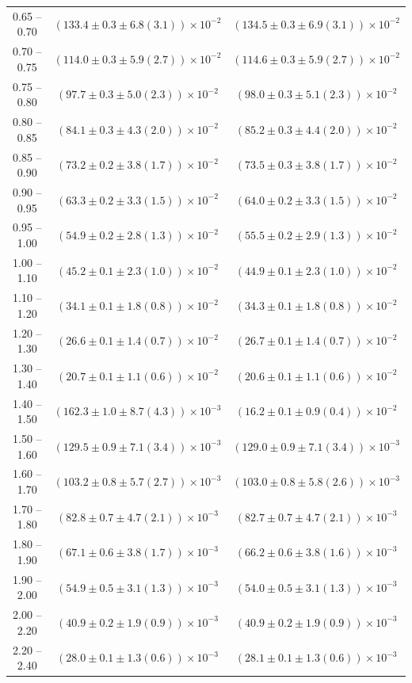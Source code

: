 \begin{table}
\begin{center}
\begin{tabular}{ c | c c }
0.65 -- 0.70 & $(133.4\pm0.3\pm6.8(3.1))\times10^{-2}$ & $(134.5\pm0.3\pm6.9(3.1))\times10^{-2}$ \\ 
0.70 -- 0.75 & $(114.0\pm0.3\pm5.9(2.7))\times10^{-2}$ & $(114.6\pm0.3\pm5.9(2.7))\times10^{-2}$ \\ 
0.75 -- 0.80 & $(97.7\pm0.3\pm5.0(2.3))\times10^{-2}$ & $(98.0\pm0.3\pm5.1(2.3))\times10^{-2}$ \\ 
0.80 -- 0.85 & $(84.1\pm0.3\pm4.3(2.0))\times10^{-2}$ & $(85.2\pm0.3\pm4.4(2.0))\times10^{-2}$ \\ 
0.85 -- 0.90 & $(73.2\pm0.2\pm3.8(1.7))\times10^{-2}$ & $(73.5\pm0.3\pm3.8(1.7))\times10^{-2}$ \\ 
0.90 -- 0.95 & $(63.3\pm0.2\pm3.3(1.5))\times10^{-2}$ & $(64.0\pm0.2\pm3.3(1.5))\times10^{-2}$ \\ 
0.95 -- 1.00 & $(54.9\pm0.2\pm2.8(1.3))\times10^{-2}$ & $(55.5\pm0.2\pm2.9(1.3))\times10^{-2}$ \\ 
1.00 -- 1.10 & $(45.2\pm0.1\pm2.3(1.0))\times10^{-2}$ & $(44.9\pm0.1\pm2.3(1.0))\times10^{-2}$ \\ 
1.10 -- 1.20 & $(34.1\pm0.1\pm1.8(0.8))\times10^{-2}$ & $(34.3\pm0.1\pm1.8(0.8))\times10^{-2}$ \\ 
1.20 -- 1.30 & $(26.6\pm0.1\pm1.4(0.7))\times10^{-2}$ & $(26.7\pm0.1\pm1.4(0.7))\times10^{-2}$ \\ 
1.30 -- 1.40 & $(20.7\pm0.1\pm1.1(0.6))\times10^{-2}$ & $(20.6\pm0.1\pm1.1(0.6))\times10^{-2}$ \\ 
1.40 -- 1.50 & $(162.3\pm1.0\pm8.7(4.3))\times10^{-3}$ & $(16.2\pm0.1\pm0.9(0.4))\times10^{-2}$ \\ 
1.50 -- 1.60 & $(129.5\pm0.9\pm7.1(3.4))\times10^{-3}$ & $(129.0\pm0.9\pm7.1(3.4))\times10^{-3}$ \\ 
1.60 -- 1.70 & $(103.2\pm0.8\pm5.7(2.7))\times10^{-3}$ & $(103.0\pm0.8\pm5.8(2.6))\times10^{-3}$ \\ 
1.70 -- 1.80 & $(82.8\pm0.7\pm4.7(2.1))\times10^{-3}$ & $(82.7\pm0.7\pm4.7(2.1))\times10^{-3}$ \\ 
1.80 -- 1.90 & $(67.1\pm0.6\pm3.8(1.7))\times10^{-3}$ & $(66.2\pm0.6\pm3.8(1.6))\times10^{-3}$ \\ 
1.90 -- 2.00 & $(54.9\pm0.5\pm3.1(1.3))\times10^{-3}$ & $(54.0\pm0.5\pm3.1(1.3))\times10^{-3}$ \\ 
2.00 -- 2.20 & $(40.9\pm0.2\pm1.9(0.9))\times10^{-3}$ & $(40.9\pm0.2\pm1.9(0.9))\times10^{-3}$ \\ 
2.20 -- 2.40 & $(28.0\pm0.1\pm1.3(0.6))\times10^{-3}$ & $(28.1\pm0.1\pm1.3(0.6))\times10^{-3}$ \\ 

\end{tabular}
\end{center}
\end{table}
